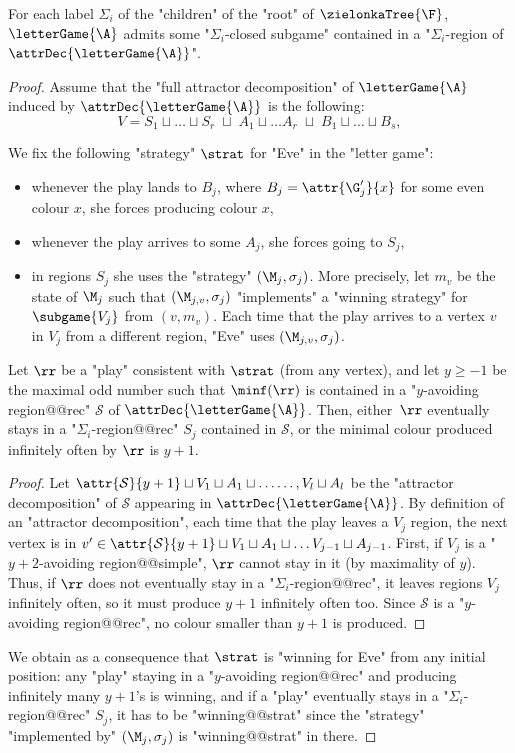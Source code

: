 \documentclass[10pt,a4paper]{amsart}
\newenvironment{subproof}[1][Proof]{\begin{proof}[#1]\renewcommand{\qedsymbol}{$\blacksquare$}}{\end{proof}}
\renewcommand{\S}{\mathcal{S}}
\renewcommand{\ss}{\sigma}
\renewcommand{\SS}{\Sigma}
\begin{document}
\begin{lemma}\label{lemma-ZT:existance-Ai-closed-regions}
	For each label $\SS_i$ of the "children" of the "root" of $\zielonkaTree{\F}$, $\letterGame{\A}$ admits some "$\SS_i$-closed subgame" contained in a "$\SS_i$-region of $\attrDec{\letterGame{\A}}$". 
\end{lemma}
\begin{proof}
	Assume that the "full attractor decomposition" of $\letterGame{\A}$ induced by $\attrDec{\letterGame{\A}}$ is the following:
	\[ V = S_1 \sqcup \dots \sqcup S_r \; \sqcup \; A_1\sqcup\dots A_r \; \sqcup \;  B_1\sqcup \dots \sqcup B_s,  \]
	
	We fix the following "strategy" $\strat$ for "Eve" in the "letter game": 
	\begin{itemize}
		\item whenever the play lands to $B_j$, where $B_j = \attr{\G_j'}{x}$ for some even colour $x$, she forces producing colour $x$,
		\item whenever the play arrives to some $A_j$, she forces going to $S_j$,
		\item in regions $S_j$ she uses the "strategy" $(\M_j, \ss_j)$. More precisely, let $m_v$ be the state of $\M_j$ such that $(\M_{j,v}, \ss_j)$ "implements" a "winning strategy" for $\subgame{V_j}$ from $(v,m_v)$. Each time that the play arrives to a vertex $v$ in $V_j$ from a different region, "Eve" uses $(\M_{j,v}, \ss_j)$.
	\end{itemize}

	\begin{claim}\label{claim-ZT:strat}
		Let $\rr$ be a "play" consistent with $\strat$ (from any vertex), and let $y\geq -1$ be the maximal odd number such that $\minf(\rr)$ is contained in a "$y$-avoiding region@@rec" $\S$ of $\attrDec{\letterGame{\A}}$. Then, either~$\rr$  eventually stays in a "$\SS_i$-region@@rec" $S_j$ contained in $\S$, or the minimal colour produced infinitely often by $\rr$ is $y+1$.
	\end{claim}
	\begin{subproof}
		Let $\attr{\S}{y+1}\sqcup V_1\sqcup A_1 \sqcup\dots \dots, V_l\sqcup A_l$ be the "attractor decomposition" of $\S$ appearing in $\attrDec{\letterGame{\A}}$.
		By definition of an "attractor decomposition", each time that the play leaves a $V_j$ region, the next vertex is in $v'\in \attr{\S}{y+1} \sqcup V_1 \sqcup A_1 \sqcup \dots  V_{j-1} \sqcup A_{j-1}$.  
		First, if $V_j$ is a "$y+2$-avoiding region@@simple", $\rr$ cannot stay in it (by maximality of $y$).
		Thus, if $\rr$ does not eventually stay in a "$\SS_i$-region@@rec", it leaves regions $V_j$ infinitely often, so it must %
		produce $y+1$ infinitely often too. Since $\S$ is a "$y$-avoiding region@@rec", no colour smaller than $y+1$ is produced.
	\end{subproof}
	We obtain as a consequence that $\strat$ is "winning for Eve" from any initial position: any "play" staying in a "$y$-avoiding region@@rec" and producing infinitely many $y+1$'s is winning, and if a "play" eventually stays in a "$\SS_i$-region@@rec" $S_j$, it has to be "winning@@strat" since the "strategy" "implemented by" $(\M_j, \ss_j)$ is "winning@@strat" in there.


\end{proof}
\end{document}
